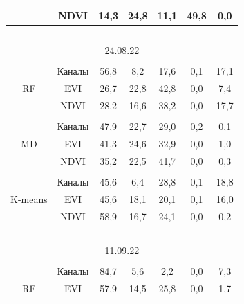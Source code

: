 \begin{table}
\begin{center}
\begin{tabular}{|c|c|c|c|c|c|c|}
&NDVI&14,3&24,8&11,1&49,8\hphantom{9}&0,0\\

\hline

\multicolumn{7}{|c|}{\ }\\[-10pt]

\multicolumn{7}{|c|}{24.08.22}\\

\hline

&&&&&&\\[-10pt]

&Каналы&56,8&\hphantom{9}8,2&17,6&0,1&17,1\hphantom{9}\\

RF&EVI&26,7&22,8&42,8&0,0&7,4\\

&NDVI&28,2&16,6&38,2&0,0&17,7\hphantom{9}\\

\hline

&&&&&&\\[-10pt]

&Каналы&47,9&22,7&29,0&0,2&0,1\\

MD&EVI&41,3&24,6&32,9&0,0&1,0\\

&NDVI&35,2&22,5&41,7&0,0&0,3\\

\hline

&&&&&&\\[-10pt]

&Каналы&45,6&\hphantom{9}6,4&28,8&0,1&18,8\hphantom{9}\\

K-means&EVI&45,6&18,1&20,1&0,1&16,0\hphantom{9}\\

&NDVI&58,9&16,7&24,1&0,0&0,2\\

\hline

\multicolumn{7}{|c|}{\ }\\[-10pt]

\multicolumn{7}{|c|}{11.09.22}\\

\hline

&&&&&&\\[-10pt]

&Каналы&84,7&\hphantom{9}5,6&\hphantom{9}2,2&0,0&7,3\\

RF&EVI&57,9&14,5&25,8&0,0&1,7\\


\end{tabular}
\end{center}
\end{table}
